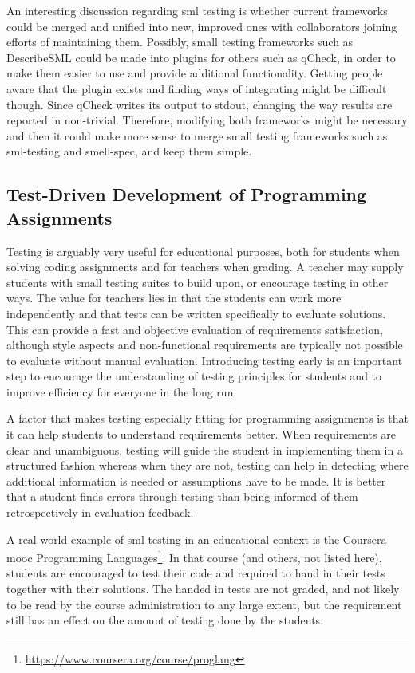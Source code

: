 \documentclass[11pt]{article}
\begin{document}
An interesting discussion regarding \gls{sml} testing is whether current frameworks could be merged and unified into new, improved ones with collaborators joining efforts of maintaining them. Possibly, small testing frameworks such as DescribeSML could be made into plugins for others such as qCheck, in order to make them easier to use and provide additional functionality. Getting people aware that the plugin exists and finding ways of integrating might be difficult though. Since qCheck writes its output to stdout, changing the way results are reported in non-trivial. Therefore, modifying both frameworks might be necessary and then it could make more sense to merge small testing frameworks such as sml-testing and smell-spec, and keep them simple.


\subsection{Test-Driven Development of Programming Assignments}
\label{subsec:tddmooc}

Testing is arguably very useful for educational purposes, both for students when solving coding assignments and for teachers when grading.
A teacher may supply students with small testing suites to build upon, or encourage testing in other ways.
The value for teachers lies in that the students can work more independently and that tests can be written specifically to evaluate solutions.
This can provide a fast and objective evaluation of requirements satisfaction, although style aspects and non-functional requirements are typically not possible to evaluate without manual evaluation.
Introducing testing early is an important step to encourage the understanding of testing principles for students and to improve efficiency for everyone in the long run.

A factor that makes testing especially fitting for programming assignments is that it can help students to understand requirements better.
When requirements are clear and unambiguous, testing will guide the student in implementing them in a structured fashion whereas when they are not, testing can help in detecting where additional information is needed or assumptions have to be made.
It is better that a student finds errors through testing than being informed of them retrospectively in evaluation feedback.

A real world example of \gls{sml} \gls{testing} in an educational context is the Coursera \gls{mooc} Programming Languages\footnote{\url{https://www.coursera.org/course/proglang}}.
In that course (and others, not listed here), students are encouraged to test their code and required to hand in their tests together with their solutions.
The handed in tests are not graded, and not likely to be read by the course administration to any large extent, but the requirement still has an effect on the amount of testing done by the students.
\end{document}
